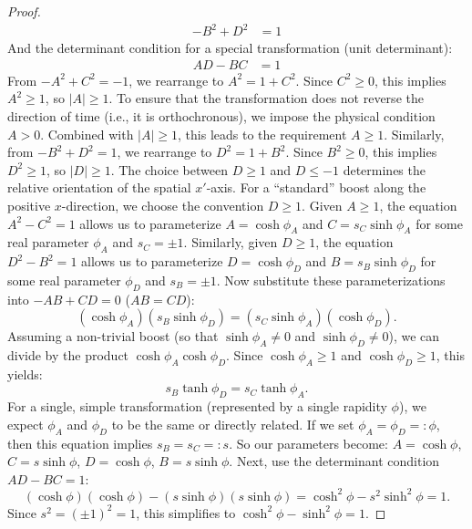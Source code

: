 \documentclass{amsart}
\theoremstyle{definition}
\theoremstyle{remark}
\begin{document}
\begin{proof}
\begin{align*}
    -B^2 + D^2 &= 1
  \end{align*}
  And the determinant condition for a special transformation (unit determinant):
  \begin{align*}
    AD-BC &= 1 
  \end{align*}
  From $-A^2 + C^2 = -1$, we rearrange to $A^2 = 1 + C^2$.
  Since $C^2 \geq 0$, this implies $A^2 \geq 1$, so $|A| \geq 1$.
  To ensure that the transformation does not reverse the direction of time (i.e., it is orthochronous), we impose the physical condition $A > 0$.
  Combined with $|A| \geq 1$, this leads to the requirement $A \geq 1$.
  Similarly, from $-B^2 + D^2 = 1$, we rearrange to $D^2 = 1 + B^2$.
  Since $B^2 \geq 0$, this implies $D^2 \geq 1$, so $|D| \geq 1$.
  The choice between $D \geq 1$ and $D \leq -1$ determines the relative orientation of the spatial $x'$-axis.
  For a ``standard'' boost along the positive $x$-direction, we choose the convention $D \geq 1$.
  Given $A \geq 1$, the equation $A^2 - C^2 = 1$ allows us to parameterize $A = \cosh\phi_A$ and $C = s_C \sinh\phi_A$ for some real parameter $\phi_A$ and $s_C = \pm 1$.
  Similarly, given $D \geq 1$, the equation $D^2 - B^2 = 1$ allows us to parameterize $D = \cosh\phi_D$ and $B = s_B \sinh\phi_D$ for some real parameter $\phi_D$ and $s_B = \pm 1$.
  Now substitute these parameterizations into $-AB + CD = 0$ ($AB = CD$):
  \begin{equation*}
    (\cosh\phi_A)(s_B \sinh\phi_D) = (s_C \sinh\phi_A)(\cosh\phi_D).
  \end{equation*}
  Assuming a non-trivial boost (so that $\sinh\phi_A \neq 0$ and $\sinh\phi_D \neq 0$), we can divide by the product $\cosh\phi_A \cosh\phi_D$.
  Since $\cosh\phi_A \ge 1$ and $\cosh\phi_D \ge 1$, this yields:
  \begin{equation*}
    s_B \tanh\phi_D = s_C \tanh\phi_A.
  \end{equation*}
  For a single, simple transformation (represented by a single rapidity $\phi$), we expect $\phi_A$ and $\phi_D$ to be the same or directly related.
  If we set $\phi_A = \phi_D =: \phi$, then this equation implies $s_B = s_C =: s$.
  So our parameters become: $A = \cosh\phi$, $C = s \sinh\phi$, $D = \cosh\phi$, $B = s \sinh\phi$.
  Next, use the determinant condition $AD-BC=1$:
  \begin{equation*}
    (\cosh\phi)(\cosh\phi) - (s \sinh\phi)(s \sinh\phi) = \cosh^2\phi - s^2 \sinh^2\phi = 1.
  \end{equation*}
  Since $s^2 = (\pm 1)^2 = 1$, this simplifies to $\cosh^2\phi - \sinh^2\phi = 1$.

\end{proof}
\end{document}
